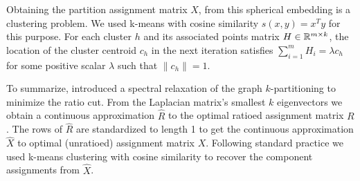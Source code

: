 Obtaining the partition assignment matrix $X$, from this spherical
embedding is a clustering problem. We used k-means with cosine
similarity $s(x,y) = x^T y$ for this purpose. For each cluster $h$
and its associated points matrix $H \in \mathbb{R}^{m \times k}$, the
location of the cluster centroid $c_h$ in the next iteration satisfies
$ \sum_{i=1}^m H_i = \lambda c_h $ for some positive scalar $\lambda$
such that $ \| c_h \| = 1$.

To summarize, \cite{Chan:94} introduced a spectral relaxation of the
graph $k$-partitioning to minimize the ratio cut. From the Laplacian
matrix's smallest $k$ eigenvectors we obtain a continuous approximation
$\hat{R}$ to the optimal ratioed assignment matrix $R$. The rows of
$\hat{R}$ are standardized to length 1 to get the continuous
approximation $\hat{X}$ to optimal (unratioed) assignment matrix $X$.
Following standard practice we used k-means clustering with cosine
similarity to recover the component assignments from $\hat{X}$.



